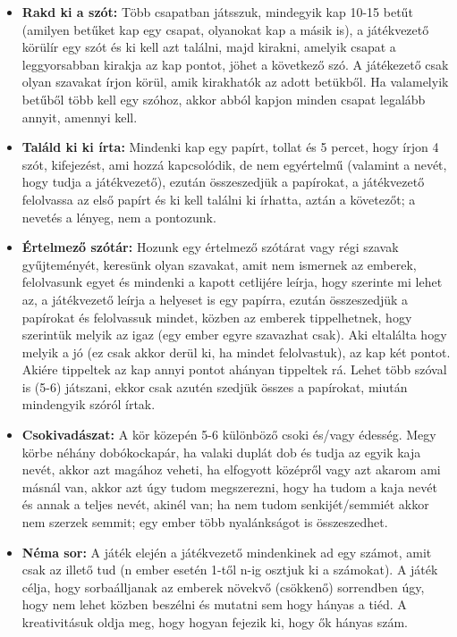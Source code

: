 \documentclass[a4paper, 12pt, twoside, openright]{article}
\begin{document}
\begin{itemize}
\item \textbf{Rakd ki a szót:} Több csapatban játsszuk, mindegyik kap 10-15 betűt (amilyen betűket kap egy csapat, olyanokat kap a másik is), a játékvezető körülír egy szót és ki kell azt találni, majd kirakni, amelyik csapat a leggyorsabban kirakja az kap pontot, jöhet a következő szó. A játékezető csak olyan szavakat írjon körül, amik kirakhatók az adott betükből. Ha valamelyik betűből több kell egy szóhoz, akkor abból kapjon minden csapat legalább annyit, amennyi kell.

\item \textbf{Találd ki ki írta:} Mindenki kap egy papírt, tollat és 5 percet, hogy írjon 4 szót, kifejezést, ami hozzá kapcsolódik, de nem egyértelmű (valamint a nevét, hogy tudja a játékvezető), ezután összeszedjük a papírokat, a játékvezető felolvassa az első papírt és ki kell találni ki írhatta, aztán a követezőt; a nevetés a lényeg, nem a pontozunk.

\item \textbf{Értelmező szótár:} Hozunk egy értelmező szótárat vagy régi szavak gyűjteményét, keresünk olyan szavakat, amit nem ismernek az emberek, felolvasunk egyet és mindenki a kapott cetlijére leírja, hogy szerinte mi lehet az, a játékvezető leírja a helyeset is egy papírra, ezután összeszedjük a papírokat és felolvassuk mindet, közben az emberek tippelhetnek, hogy szerintük melyik az igaz (egy ember egyre szavazhat csak). Aki eltalálta hogy melyik a jó (ez csak akkor derül ki, ha mindet felolvastuk), az kap két pontot. Akiére tippeltek az kap annyi pontot ahányan tippeltek rá. Lehet több szóval is (5-6) játszani, ekkor csak azutén szedjük összes a papírokat, miután mindengyik szóról írtak. 

\item \textbf{Csokivadászat:} A kör közepén 5-6 különböző csoki és/vagy édesség. Megy körbe néhány dobókockapár, ha valaki duplát dob és tudja az egyik kaja nevét, akkor azt magához veheti, ha elfogyott középről vagy azt akarom ami másnál van, akkor azt úgy tudom megszerezni, hogy ha tudom a kaja nevét és annak a teljes nevét, akinél van; ha nem tudom senkijét/semmiét akkor nem szerzek semmit; egy ember több nyalánkságot is összeszedhet.

\item \textbf{Néma sor:} A játék elején a játékvezető mindenkinek ad egy számot, amit csak az illető tud (n ember esetén 1-től n-ig osztjuk ki a számokat). A játék célja, hogy sorbaálljanak az emberek növekvő (csökkenő) sorrendben úgy, hogy nem lehet közben beszélni és mutatni sem hogy hányas a tiéd. A kreativitásuk oldja meg, hogy hogyan fejezik ki, hogy ők hányas szám.


\end{itemize}
\end{document}
